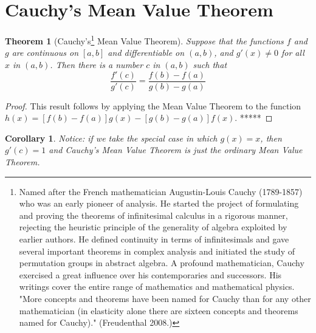 \documentclass[10pt]{report}
\newtheorem{thm2}{Theorem}[section]
\newtheorem{cor2}{Corollary}[section]
\begin{document}
\section{Cauchy's Mean Value Theorem}
\begin{thm2}[Cauchy's\footnote{Named after the French mathematician Augustin-Louis Cauchy (1789-1857) who was an early pioneer of analysis. He started the project of formulating and proving the theorems of infinitesimal calculus in a rigorous manner, rejecting the heuristic principle of the generality of algebra exploited by earlier authors. He defined continuity in terms of infinitesimals and gave several important theorems in complex analysis and initiated the study of permutation groups in abstract algebra. A profound mathematician, Cauchy exercised a great influence over his contemporaries and successors. His writings cover the entire range of mathematics and mathematical physics. "More concepts and theorems have been named for Cauchy than for any other mathematician (in elasticity alone there are sixteen concepts and theorems named for Cauchy)." (Freudenthal 2008.)} Mean Value Theorem]
Suppose that the functions $f$ and $g$ are continuous on $[a,b]$ and differentiable on $(a,b)$, and $g'(x)\neq 0$ for all $x$ in $(a,b)$. Then there is a number $c$ in $(a,b)$ such that
$$\frac{f'(c)}{g'(c)}=\frac{f(b)-f(a)}{g(b)-g(a)}$$
\end{thm2}
\begin{proof}
This result follows by applying the Mean Value Theorem to the function $h(x) = [f(b) - f(a)]g(x) - [g(b)-g(a)]f(x)$. *****
\end{proof}
\begin{cor2}
Notice: if we take the special case in which $g(x)=x$, then $g'(c)=1$ and Cauchy's Mean Value Theorem is just the ordinary Mean Value Theorem.
\end{cor2}
\end{document}

